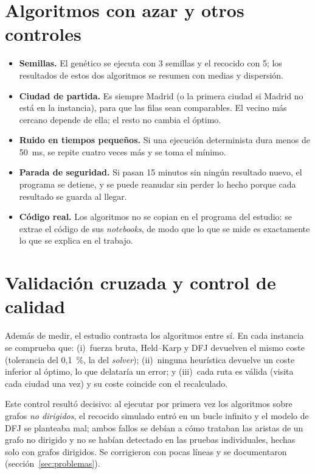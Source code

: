 \section{Algoritmos con azar y otros controles}

\begin{itemize}
  \item \textbf{Semillas.} El genético se ejecuta con 3 semillas y el recocido con 5; los resultados de estos dos algoritmos se resumen con medias y dispersión.
  \item \textbf{Ciudad de partida.} Es siempre Madrid (o la primera ciudad si Madrid no está en la instancia), para que las filas sean comparables. El vecino más cercano depende de ella; el resto no cambia el óptimo.
  \item \textbf{Ruido en tiempos pequeños.} Si una ejecución determinista dura menos de 50~ms, se repite cuatro veces más y se toma el mínimo.
  \item \textbf{Parada de seguridad.} Si pasan 15 minutos sin ningún resultado nuevo, el programa se detiene, y se puede reanudar sin perder lo hecho porque cada resultado se guarda al llegar.
  \item \textbf{Código real.} Los algoritmos no se copian en el programa del estudio: se extrae el código de sus \emph{notebooks}, de modo que lo que se mide es exactamente lo que se explica en el trabajo.
\end{itemize}

\section{Validación cruzada y control de calidad}\label{sec:validacion}

Además de medir, el estudio contrasta los algoritmos entre sí. En cada instancia se comprueba que: (i)~fuerza bruta, Held--Karp y DFJ devuelven el mismo coste (tolerancia del 0,1~\%, la del \emph{solver});
(ii)~ninguna heurística devuelve un coste inferior al óptimo, lo que delataría un error; y (iii)~cada ruta es válida (visita cada ciudad una vez) y su coste coincide con el recalculado.

Este control resultó decisivo: al ejecutar por primera vez los algoritmos sobre grafos \emph{no dirigidos}, el recocido simulado entró en un bucle infinito y el modelo de DFJ se planteaba mal; ambos fallos se debían a cómo trataban las aristas de un grafo no dirigido
y no se habían detectado en las pruebas individuales, hechas solo con grafos dirigidos. Se corrigieron con pocas líneas y se documentaron (sección~\ref{sec:problemas}).

